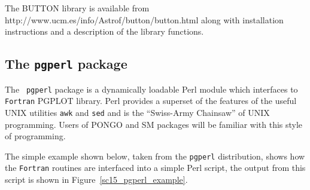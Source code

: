 \documentclass[twoside,11pt]{article}
\newcommand{\htmladdnormallink}[2]{#1}
\newcommand{\htmlref}[2]{#1}
\newcommand{\xlabel}[1]{}
\begin{document}
The BUTTON library is available from \htmladdnormallink{
http://www.ucm.es/info/Astrof/button/button.html}{
http://www.ucm.es/info/Astrof/button/button.html} along with
installation instructions and a description of the library functions.
       
\subsection{\xlabel{sc15_pgperl}The {\tt pgperl} package\label{sc15_pgperl}}

The \htmladdnormallink{{\tt
pgperl}}{http://www.aao.gov.au/local/www/kgb/pgperl/} package is a
dynamically loadable \htmladdnormallink{Perl}{http://www.perl.com/}
module which interfaces to {\tt Fortran} PGPLOT library. Perl provides
a superset of the features of the useful UNIX utilities \texttt{awk}
and \texttt{sed} and is the ``Swiss-Army Chainsaw'' of UNIX
programming. Users of \htmlref{PONGO}{sc15_pongo} and
\htmlref{SM}{sc15_sm} packages will be familiar with this style of
programming. 

The simple example shown below, taken from the {\tt pgperl}
distribution, shows how the {\tt Fortran} routines are interfaced into
a simple Perl script, the output from this script is shown in
Figure~\ref{sc15_pgperl_example}.
\end{document}
